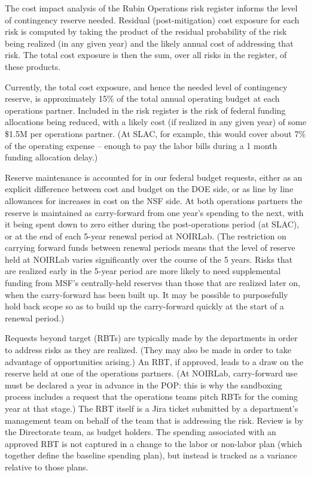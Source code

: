 \begin{itemize}
The cost impact analysis of the Rubin Operations risk register informs the level of contingency reserve needed.
Residual (post-mitigation) cost exposure for each risk is computed by taking the  product of the residual probability of the risk being realized (in any given year) and the likely annual cost of addressing that risk.
The total cost exposure is then the sum, over all risks in the register, of these products.

Currently, the total cost exposure, and hence the needed level of contingency reserve, is approximately 15\% of the total annual operating budget at each operations partner.
Included in the risk register is the risk of federal funding allocations being reduced, with a likely cost (if realized in any given year) of some \$1.5M per operations partner.
(At SLAC, for example, this would cover about 7\% of the operating expense -- enough to pay the labor bills during a 1 month funding allocation delay.)

Reserve maintenance is accounted for in our federal budget requests, either as an explicit difference between cost and budget on the DOE side, or as line by line allowances for increases in cost on the NSF side.
At both operations partners the reserve is maintained as carry-forward from one year's spending to the next, with it being spent down to zero either during the post-operations period (at SLAC), or at the end of each 5-year renewal period at NOIRLab.
(The restriction on carrying forward funds between renewal periods means that the level of reserve held at NOIRLab varies significantly over the course of the 5 years.
Risks that are realized early in the 5-year period are more likely to need supplemental funding from MSF's centrally-held reserves than those that are realized later on, when the carry-forward has been built up.
It may be possible to purposefully hold back scope so as to build up the carry-forward quickly at the start of a renewal period.)

Requests beyond target (RBTs) are typically made by the departments in order to address risks as they are realized.
(They may also be made in order to take advantage of opportunities arising.)
An RBT, if approved, leads to a draw on the reserve held at one of the operations partners.
(At NOIRLab, carry-forward use must be declared a year in advance in the POP: this is why the sandboxing process includes a request that the operations teams pitch RBTs for the coming year at that stage.)
The RBT itself is a Jira ticket submitted by a department's management team on behalf of the team that is addressing the risk.
Review is by the Directorate team, as budget holders.
The spending associated with an approved RBT is not captured in a change to the labor or non-labor plan (which together define the baseline spending plan), but instead is tracked as a variance relative to those plans.


\end{itemize}
